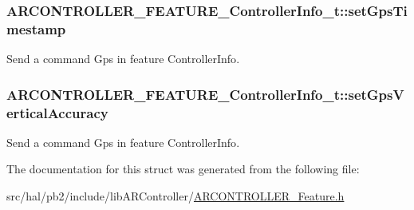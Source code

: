 \subsubsection[{\texorpdfstring{set\+Gps\+Timestamp}{setGpsTimestamp}}]{ A\+R\+C\+O\+N\+T\+R\+O\+L\+L\+E\+R\+\_\+\+F\+E\+A\+T\+U\+R\+E\+\_\+\+Controller\+Info\+\_\+t\+::set\+Gps\+Timestamp}\hypertarget{struct_a_r_c_o_n_t_r_o_l_l_e_r___f_e_a_t_u_r_e___controller_info__t_a888ea4a01414a3d48d540a9986355dbb}{}\label{struct_a_r_c_o_n_t_r_o_l_l_e_r___f_e_a_t_u_r_e___controller_info__t_a888ea4a01414a3d48d540a9986355dbb}
Send a command {\ttfamily Gps} in feature {\ttfamily Controller\+Info}. 
\subsubsection[{\texorpdfstring{set\+Gps\+Vertical\+Accuracy}{setGpsVerticalAccuracy}}]{ A\+R\+C\+O\+N\+T\+R\+O\+L\+L\+E\+R\+\_\+\+F\+E\+A\+T\+U\+R\+E\+\_\+\+Controller\+Info\+\_\+t\+::set\+Gps\+Vertical\+Accuracy}\hypertarget{struct_a_r_c_o_n_t_r_o_l_l_e_r___f_e_a_t_u_r_e___controller_info__t_a29fbeb31a13093ddfb98f5af389f9f1e}{}\label{struct_a_r_c_o_n_t_r_o_l_l_e_r___f_e_a_t_u_r_e___controller_info__t_a29fbeb31a13093ddfb98f5af389f9f1e}
Send a command {\ttfamily Gps} in feature {\ttfamily Controller\+Info}. 

The documentation for this struct was generated from the following file\+:\begin{DoxyCompactItemize}
\item 
src/hal/pb2/include/lib\+A\+R\+Controller/\hyperlink{_a_r_c_o_n_t_r_o_l_l_e_r___feature_8h}{A\+R\+C\+O\+N\+T\+R\+O\+L\+L\+E\+R\+\_\+\+Feature.\+h}\end{DoxyCompactItemize}
